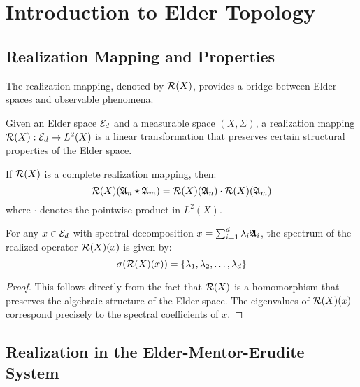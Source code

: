 \chapter{Introduction to Elder Topology}

\section{Realization Mapping and Properties}

The realization mapping, denoted by $\mathcal{R}(X)$, provides a bridge between Elder spaces and observable phenomena.

\begin{definition}
Given an Elder space $\mathcal{E}_{d}$ and a measurable space $(X, \Sigma)$, a realization mapping $\mathcal{R}(X): \mathcal{E}_{d} \rightarrow L^2(X)$ is a linear transformation that preserves certain structural properties of the Elder space.
\end{definition}

\begin{theorem}
If $\mathcal{R}(X)$ is a complete realization mapping, then:
\begin{equation}
\mathcal{R}(X)(\mathfrak{A}_{n} \star \mathfrak{A}_{m}) = \mathcal{R}(X)(\mathfrak{A}_{n}) \cdot \mathcal{R}(X)(\mathfrak{A}_{m})
\end{equation}
where $\cdot$ denotes the pointwise product in $L^2(X)$.
\end{theorem}

\begin{lemma}
For any $x \in \mathcal{E}_{d}$ with spectral decomposition $x = \sum_{i=1}^{d} \lambda_i \mathfrak{A}_{i}$, the spectrum of the realized operator $\mathcal{R}(X)(x)$ is given by:
\begin{equation}
\sigma(\mathcal{R}(X)(x)) = \{\lambda_1, \lambda_2, \ldots, \lambda_d\}
\end{equation}
\end{lemma}

\begin{proof}
This follows directly from the fact that $\mathcal{R}(X)$ is a homomorphism that preserves the algebraic structure of the Elder space. The eigenvalues of $\mathcal{R}(X)(x)$ correspond precisely to the spectral coefficients of $x$.
\end{proof}

\section{Realization in the Elder-Mentor-Erudite System}

